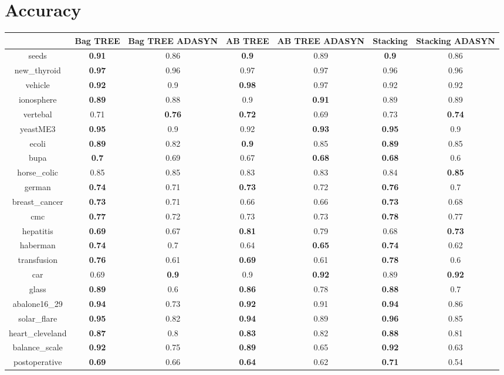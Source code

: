 \documentclass{article}%
\begin{document}
%
\normalsize%
\section*{Accuracy}%
\begin{tabular}{c|cccccc}%
&Bag TREE&Bag TREE ADASYN&AB TREE&AB TREE ADASYN&Stacking&Stacking ADASYN\\%
\hline%
seeds&\textbf{0.91}&0.86&\textbf{0.9}&0.89&\textbf{0.9}&0.86\\%
new\_thyroid&\textbf{0.97}&0.96&0.97&0.97&0.96&0.96\\%
vehicle&\textbf{0.92}&0.9&\textbf{0.98}&0.97&0.92&0.92\\%
ionosphere&\textbf{0.89}&0.88&0.9&\textbf{0.91}&0.89&0.89\\%
vertebal&0.71&\textbf{0.76}&\textbf{0.72}&0.69&0.73&\textbf{0.74}\\%
yeastME3&\textbf{0.95}&0.9&0.92&\textbf{0.93}&\textbf{0.95}&0.9\\%
ecoli&\textbf{0.89}&0.82&\textbf{0.9}&0.85&\textbf{0.89}&0.85\\%
bupa&\textbf{0.7}&0.69&0.67&\textbf{0.68}&\textbf{0.68}&0.6\\%
horse\_colic&0.85&0.85&0.83&0.83&0.84&\textbf{0.85}\\%
german&\textbf{0.74}&0.71&\textbf{0.73}&0.72&\textbf{0.76}&0.7\\%
breast\_cancer&\textbf{0.73}&0.71&0.66&0.66&\textbf{0.73}&0.68\\%
cmc&\textbf{0.77}&0.72&0.73&0.73&\textbf{0.78}&0.77\\%
hepatitis&\textbf{0.69}&0.67&\textbf{0.81}&0.79&0.68&\textbf{0.73}\\%
haberman&\textbf{0.74}&0.7&0.64&\textbf{0.65}&\textbf{0.74}&0.62\\%
transfusion&\textbf{0.76}&0.61&\textbf{0.69}&0.61&\textbf{0.78}&0.6\\%
car&0.69&\textbf{0.9}&0.9&\textbf{0.92}&0.89&\textbf{0.92}\\%
glass&\textbf{0.89}&0.6&\textbf{0.86}&0.78&\textbf{0.88}&0.7\\%
abalone16\_29&\textbf{0.94}&0.73&\textbf{0.92}&0.91&\textbf{0.94}&0.86\\%
solar\_flare&\textbf{0.95}&0.82&\textbf{0.94}&0.89&\textbf{0.96}&0.85\\%
heart\_cleveland&\textbf{0.87}&0.8&\textbf{0.83}&0.82&\textbf{0.88}&0.81\\%
balance\_scale&\textbf{0.92}&0.75&\textbf{0.89}&0.65&\textbf{0.92}&0.63\\%
postoperative&\textbf{0.69}&0.66&\textbf{0.64}&0.62&\textbf{0.71}&0.54\\%
\end{tabular}
\end{document}
